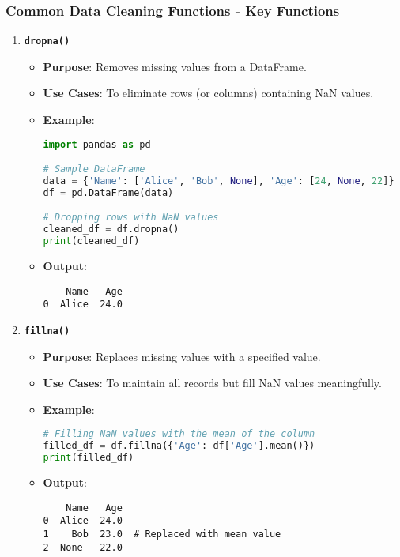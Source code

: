 \documentclass[aspectratio=169]{beamer}
\begin{document}
\begin{frame}[fragile]
    \frametitle{Common Data Cleaning Functions - Key Functions}
    \begin{enumerate}
        \item \textbf{\texttt{dropna()}}  
            \begin{itemize}
                \item \textbf{Purpose}: Removes missing values from a DataFrame.
                \item \textbf{Use Cases}: To eliminate rows (or columns) containing NaN values.
                \item \textbf{Example}:
                \begin{lstlisting}[language=Python]
import pandas as pd

# Sample DataFrame
data = {'Name': ['Alice', 'Bob', None], 'Age': [24, None, 22]}
df = pd.DataFrame(data)

# Dropping rows with NaN values
cleaned_df = df.dropna()
print(cleaned_df)
                \end{lstlisting}
                \item \textbf{Output}:
                \begin{lstlisting}
    Name   Age
0  Alice  24.0
                \end{lstlisting}
            \end{itemize}
        
        \item \textbf{\texttt{fillna()}}  
            \begin{itemize}
                \item \textbf{Purpose}: Replaces missing values with a specified value.
                \item \textbf{Use Cases}: To maintain all records but fill NaN values meaningfully.
                \item \textbf{Example}:
                \begin{lstlisting}[language=Python]
# Filling NaN values with the mean of the column
filled_df = df.fillna({'Age': df['Age'].mean()})
print(filled_df)
                \end{lstlisting}
                \item \textbf{Output}:
                \begin{lstlisting}
    Name   Age
0  Alice  24.0
1    Bob  23.0  # Replaced with mean value
2  None   22.0
                \end{lstlisting}
            \end{itemize}
    \end{enumerate}
\end{frame}
\end{document}
